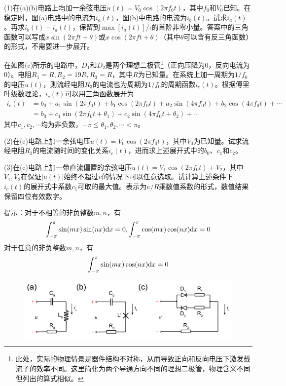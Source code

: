 \documentclass[11pt,a4paper,onecolumn,UTF8]{ctexart}
\begin{document}
	(1)在(a)(b)电路上均加一余弦电压$u(t)=V_0\cos(2\pi f_0 t)$，其中$f_0$和$V_0$已知。在稳定时，图(a)电路中的电流为$i_a(t)$，图(b)中电路的电流为$i_b(t)$。试求$i_a(t)$。再求$i_b(t)-i_a(t)$，保留到$\max[i_a(t)]/\iota$的首阶非零小量。答案中的三角函数可以写成$x\sin(2\pi ft+\theta)$或$x\cos(2\pi ft+\theta)$（其中$\theta$可以含有反三角函数）的形式，不需要进一步展开。
	
	
	在如图(c)所示的电路中，$D_1$和$D_2$是两个理想二极管\footnote{此处，实际的物理情景是器件结构不对称，从而导致正向和反向电压下激发载流子的效率不同。这里简化为两个导通方向不同的理想二极管，物理含义不同但列出的算式相似。}（正向压降为0，反向电流为0）。电阻$R_1=R,R_2=19R,R_3=R$，其中$R$为已知量。在系统上加一周期为$1/f_0$的电压$u(t)$，则流经电阻$R_3$的电流也为周期为$1/f_0$的周期函数$i_c(t)$。根据傅里叶级数理论，$i_c(t)$可以用三角函数展开为
	\begin{align*}
		i_c(t)&=b_0+a_1\sin(2\pi f_0t)+b_1\cos(2\pi f_0t)+a_2\sin(4\pi f_0t)+b_2\cos(4\pi f_0t)+\cdots\\
		&=b_0+c_1\sin(2\pi f_0t+\theta_1)+c_2\sin(4\pi f_0t+\theta_2)+\cdots
	\end{align*}
	其中$c_1,c_2,\cdots$均为非负数，$-\pi\leq\theta_1,\theta_2,\cdots<\pi$。
	
	(2)在(c)电路上加一余弦电压$u(t)=V_0\cos(2\pi f_0 t)$，其中$V_0$为已知量。试求流经电阻$R_3$的电流随时间的变化关系$i_c(t)$，进而求上述展开式中的$b_0$、$c_1$和$c_2$。
	
	(3)在(c)电路上加一带直流偏置的余弦电压$u(t)=V_1\cos(2\pi f_0t)+V_2$，其中$V_1,V_2$在保证$|u(t)|$始终不超过$\upsilon$的情况下可以任意选取。试计算上述条件下$i_c(t)$的展开式中系数$c_1$可取的最大值。表示为$\upsilon/R$乘数值系数的形式，数值结果保留四位有效数字。
	
	提示：对于不相等的非负整数$m,n$，有
	\begin{equation*}
		\int_{-\pi}^{\pi}\sin(mx)\sin(nx)\mathrm{d} x=0,
		\int_{-\pi}^{\pi}\cos(mx)\cos(nx)\mathrm{d} x=0
	\end{equation*}
	对于任意的非负整数$m,n$，有
	\begin{equation*}
		\int_{-\pi}^{\pi}\sin(mx)\cos(nx)\mathrm{d} x=0
	\end{equation*}
	
	
	\begin{figure}[!bh]
	\centering
	\includegraphics[width=0.92\columnwidth]{6.png}
	\end{figure}
	
\end{document}
